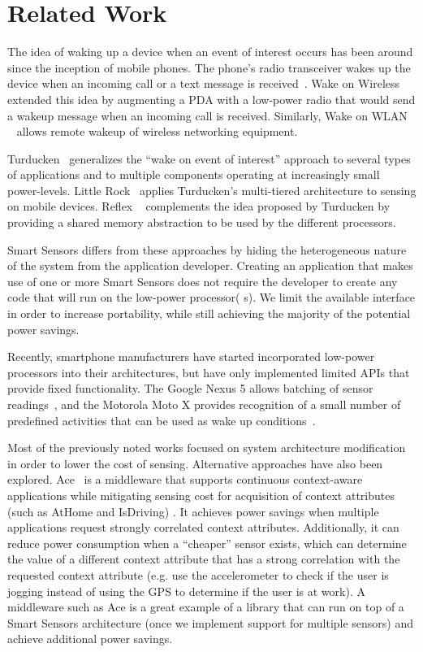 \section{Related Work}\label{sec:related}

The idea of waking up a device when an event of interest occurs has been 
around since the inception of mobile phones. The phone's radio 
transceiver wakes up the device when an incoming call or a text message 
is received~\cite{gobi}. Wake on Wireless~\cite{shih2002wake} extended this idea by 
augmenting a PDA with a low-power radio that would send a wakeup message 
when an incoming call is received. Similarly, Wake on WLAN
~\cite{mishra2006wake} allows remote wakeup of wireless networking
equipment.

Turducken~\cite{turducken} generalizes the ``wake on event of interest'' 
approach to several types of applications and to multiple components 
operating at increasingly small power-levels. Little Rock~\cite{littlerock} 
applies Turducken's multi-tiered architecture to sensing on mobile 
devices. Reflex ~\cite{reflex} complements the idea proposed by Turducken 
by providing a shared memory abstraction to be used by the different 
processors.

Smart Sensors differs from these approaches by hiding the heterogeneous 
nature of the system from the application developer. Creating an 
application that makes use of one or more Smart Sensors does not require 
the developer to create any code that will run on the low-power processor(
s). We limit the available interface in order to increase portability, 
while still achieving the majority of the potential power savings.

Recently, smartphone manufacturers have started incorporated low-power 
processors into their architectures, but have only implemented limited 
APIs that provide fixed functionality. The Google Nexus 5 allows batching 
of sensor readings~\cite{ android4.4,nexus5}, and the Motorola Moto X 
provides recognition of a small number of predefined activities that can 
be used as wake up conditions~\cite{motox}.

Most of the previously noted works focused on system architecture 
modification in order to lower the cost of sensing. Alternative 
approaches have also been explored. Ace~\cite{ace} is a middleware that 
supports continuous context-aware applications while mitigating sensing 
cost for acquisition of context attributes (such as AtHome and IsDriving)
. It achieves power savings when multiple applications request strongly 
correlated context attributes. Additionally, it can reduce power 
consumption when a ``cheaper'' sensor exists, which can determine the 
value of a different context attribute that has a strong correlation with 
the requested context attribute (e.g. use the accelerometer to check if 
the user is jogging instead of using the GPS to determine if the user is 
at work). A middleware such as Ace is a great example of a library that 
can run on top of a Smart Sensors architecture (once we implement support 
for multiple sensors) and achieve additional power savings.

